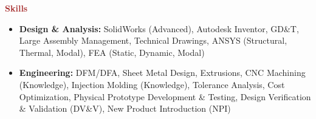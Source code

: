 \documentclass[11pt, letterpaper]{article}
\begin{document}
\noindent \textbf{\large \textcolor{Brown}{Skills}}\vspace{2pt}\\
\begin{itemize}[leftmargin=*, label=\textbullet]
\setlength\itemsep{-2pt}
\vspace{-8pt}
\item \textbf{Design \& Analysis:} SolidWorks (Advanced), Autodesk Inventor, GD\&T, Large Assembly Management, Technical Drawings, ANSYS (Structural, Thermal, Modal), FEA (Static, Dynamic, Modal)
\item \textbf{Engineering:} DFM/DFA, Sheet Metal Design, Extrusions, CNC Machining (Knowledge), Injection Molding (Knowledge), Tolerance Analysis, Cost Optimization, Physical Prototype Development \& Testing, Design Verification \& Validation (DV\&V), New Product Introduction (NPI)
\end{itemize}
\end{document}
